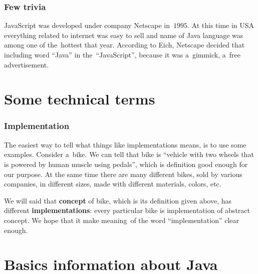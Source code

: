 \documentclass[10pt,t]{beamer}
\begin{document}
\begin{frame}
  \frametitle{Few trivia}


  JavaScript was developed under company Netscape in~$1995$. At this time
  in USA everything related to internet was easy to sell and name of Java
  language was among one of the~hottest that year. According to Eich,
  Netscape decided that including word ``Java'' in the~``JavaScript'',
  because it was a~gimmick, a~free advertisement.

\end{frame}










\section{Some technical terms}


\begin{frame}
  \frametitle{Implementation}


  The easiest way to tell what things like implementations means, is to use
  some examples. Consider a~bike. We can tell that bike is ``vehicle with
  two wheels that is powered by human muscle using pedals'', which is
  definition good enough for our purpose. At the same time there are many
  different bikes, sold by various companies, in different sizes, made with
  different materials, colors, etc.

  We will said that \textbf{concept} of bike, which is its definition given
  above, has different \textbf{implementations}: every particular bike
  is implementation of abstract concept. We hope that it make meaning~of
  the word ``implementation'' clear enough.

\end{frame}










\section{Basics information about Java}
\end{document}
